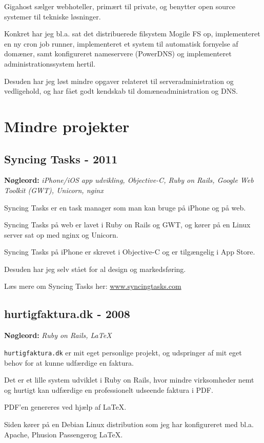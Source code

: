 \documentclass[a4paper]{article}
\newcommand{\keywords}[1]{\small\textbf{Nøgleord:} \emph{#1}\normalsize}
\begin{document}
Gigahost sælger webhoteller, primært til private, og benytter open source systemer til tekniske løsninger.

Konkret har jeg bl.a. sat det distribuerede filsystem Mogile FS op, implementeret en ny cron job runner, implementeret et system til automatisk fornyelse af domæner, samt konfigureret nameservere (PowerDNS) og implementeret administrationssystem hertil.

Desuden har jeg løst mindre opgaver relateret til serveradministration og vedligehold, og har fået godt kendskab til domæneadministration og DNS.


\section*{Mindre projekter}

\subsection*{Syncing Tasks - 2011}
\keywords{iPhone/iOS app udvikling, Objective-C, Ruby on Rails, Google Web Toolkit (GWT), Unicorn, nginx}

Syncing Tasks er en task manager som man kan bruge på iPhone og på web. 

Syncing Tasks på web er lavet i Ruby on Rails og GWT, og kører på en Linux server sat op med nginx og Unicorn.

Syncing Tasks på iPhone er skrevet i Objective-C og er tilgængelig i App Store.

Desuden har jeg selv stået for al design og markedsføring.

Læs mere om Syncing Tasks her: \href{http://www.syncingtasks.com}{www.syncingtasks.com}

\subsection*{hurtigfaktura.dk - 2008}
\keywords{Ruby on Rails, \LaTeX}

\texttt{hurtigfaktura.dk} er mit eget personlige projekt, og udspringer af mit eget behov for at kunne udfærdige en faktura.

Det er et lille system udviklet i Ruby on Rails, hvor mindre virksomheder nemt og hurtigt kan udfærdige en professionelt udseende faktura i PDF.

PDF'en genereres ved hjælp af \LaTeX.

Siden kører på en Debian Linux distribution som jeg har konfigureret med bl.a. Apache, Phusion Passenger\texttrademark og \LaTeX.
\end{document}
